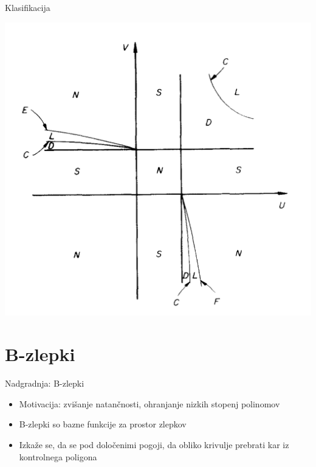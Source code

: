 \documentclass{beamer} %
\begin{document}
\begin{frame}{Klasifikacija}
	\begin{center}
		\includegraphics[width=0.6\columnwidth]{klas.jpg}
	\end{center}
\end{frame}


\section{B-zlepki}
\begin{frame}{Nadgradnja: B-zlepki}
	\begin{itemize}
		\item Motivacija: zvišanje natančnosti, ohranjanje nizkih stopenj polinomov
		\item B-zlepki so bazne funkcije za prostor zlepkov
		\item Izkaže se, da se pod določenimi pogoji, da obliko krivulje prebrati kar iz kontrolnega poligona
	\end{itemize}
	
\end{frame}
\end{document}
